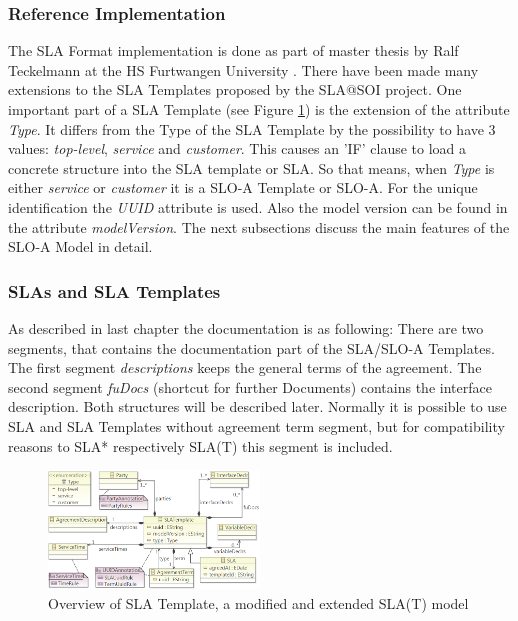 \subsubsection{Reference Implementation}\label{section_ref_impl}
The SLA Format implementation is done as part of master thesis by Ralf Teckelmann at the HS Furtwangen University  \cite{Teckelmann2012}. There have been made many extensions to the SLA Templates proposed by the SLA@SOI project.
One important part of a SLA Template (see Figure \ref{fig:overview_SLAT}) is the extension of the attribute {\it Type}. It differs from the Type of the SLA Template by the possibility to have 3 values: {\it top-level}, {\it service} and {\it customer}. This causes an 'IF' clause to load a concrete structure into the SLA template or SLA. So that means, when {\it Type} is either {\it service} or {\it customer} it is a SLO-A Template or SLO-A. For the unique identification the {\it UUID} attribute is used. Also the model version can be found in the attribute {\it modelVersion}.
The next subsections discuss the main features of the SLO-A Model in detail.

\subsubsection{SLAs and SLA Templates}
As described in last chapter the documentation is as following: There are two segments, that contains the documentation part of the SLA/SLO-A Templates. The first segment {\it descriptions} keeps the general terms of the agreement. The second segment {\it fuDocs} (shortcut for further Documents) contains the interface description. Both structures will be described later. Normally it is possible to use SLA and SLA Templates without agreement term segment, but for compatibility reasons to SLA* respectively SLA(T) this segment is included.
\begin{figure}[ht]
		\centering
\includegraphics[width=0.5\textwidth]{fig/sloa_slas_sla-templates.png}
\caption{Overview of SLA Template, a modified and extended SLA(T) model  \cite{Lambea2011}}
\label{fig:overview_SLAT}
\end{figure}

